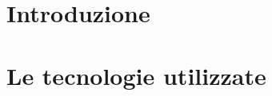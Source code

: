 \frontmatter
\maketitle
\dedication{
  Placeholder
}

\tableofcontents

\mainmatter

\chapter{Introduzione}


\chapter{Le tecnologie utilizzate}


\backmatter
